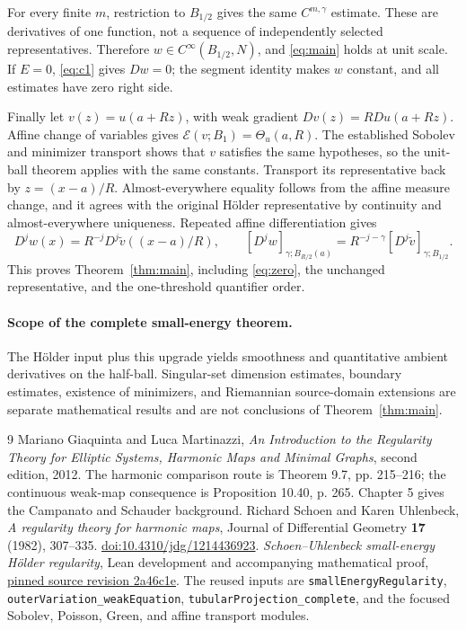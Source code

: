 \documentclass[11pt,a4paper]{article}
\numberwithin{equation}{section}
\theoremstyle{definition}
\theoremstyle{remark}
\newcommand{\E}{\mathcal E}
\newcommand{\Th}{\Theta}
\begin{document}
For every finite \(m\), restriction to \(B_{1/2}\) gives the same
\(C^{m,\gamma}\) estimate. These are derivatives of one function,
not a sequence of independently selected representatives. Therefore
\(w\in C^\infty(B_{1/2},N)\), and \eqref{eq:main} holds at unit scale.
If \(E=0\), \eqref{eq:c1} gives \(Dw=0\); the segment identity makes
\(w\) constant, and all estimates have zero right side.

Finally let \(v(z)=u(a+Rz)\), with weak gradient
\(Dv(z)=RDu(a+Rz)\). Affine change of variables gives
\(\E(v;B_1)=\Th_u(a,R)\). The established Sobolev and minimizer
transport shows that \(v\) satisfies the same hypotheses, so the
unit-ball theorem applies with the same constants. Transport its
representative back by \(z=(x-a)/R\). Almost-everywhere equality follows
from the affine measure change, and it agrees with the original H\"older
representative by continuity and almost-everywhere uniqueness. Repeated
affine differentiation gives
\[
 D^jw(x)=R^{-j}D^j\widetilde v((x-a)/R),\qquad
 [D^jw]_{\gamma;B_{R/2}(a)}
 =R^{-j-\gamma}[D^j\widetilde v]_{\gamma;B_{1/2}}.
\]
This proves Theorem~\ref{thm:main}, including \eqref{eq:zero}, the
unchanged representative, and the one-threshold quantifier order.

\paragraph{Scope of the complete small-energy theorem.}
The H\"older input plus this upgrade yields smoothness and quantitative
ambient derivatives on the half-ball. Singular-set dimension estimates,
boundary estimates, existence of minimizers, and Riemannian source-domain
extensions are separate mathematical results and are not conclusions of
Theorem~\ref{thm:main}.

\begin{thebibliography}{9}
 Mariano Giaquinta and Luca Martinazzi,
\emph{An Introduction to the Regularity Theory for Elliptic Systems,
Harmonic Maps and Minimal Graphs}, second edition, 2012.
The harmonic comparison route is Theorem 9.7, pp. 215--216;
the continuous weak-map consequence is Proposition 10.40, p. 265.
Chapter 5 gives the Campanato and Schauder background.
 Richard Schoen and Karen Uhlenbeck,
\emph{A regularity theory for harmonic maps}, Journal of Differential
Geometry \textbf{17} (1982), 307--335.
\href{https://doi.org/10.4310/jdg/1214436923}{doi:10.4310/jdg/1214436923}.
 \emph{Schoen--Uhlenbeck small-energy H\"older regularity},
Lean development and accompanying mathematical proof,
\href{https://github.com/BrookWW/SchoenUhlenbeckSmallEnergyRegularityFormalization/tree/2a46c1e82d0580da7e1c9f62c58d0349c911cc8e}{pinned source revision 2a46c1e}.
The reused inputs are \texttt{smallEnergyRegularity},
\texttt{outerVariation\_weakEquation}, \texttt{tubularProjection\_complete},
and the focused Sobolev, Poisson, Green, and affine transport modules.
\end{thebibliography}
\end{document}
